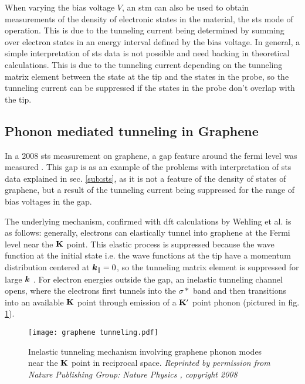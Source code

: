 \documentclass[main.tex]{subfiles}
\begin{document}
When varying the bias voltage \(V\), an \acrshort{stm} can also be used to obtain measurements of the density of electronic states in the material, the \acrshort{sts} mode of operation.
This is due to the tunneling current being determined by summing over electron states in an energy interval defined by the bias voltage.
In general, a simple interpretation of \acrshort{sts} data is not possible and need backing in theoretical calculations.
This is due to the tunneling current depending on the tunneling matrix element between the state at the tip and the states in the probe, so the tunneling current can be suppressed if the states in the probe don't overlap with the tip.


\subsection{Phonon mediated tunneling in Graphene}\label{sub:tunneling_graphene}

In a 2008 \acrshort{sts} measurement on graphene, a gap feature around the fermi level was measured \cite{zhang_giant_2008}.
This gap is as an example of the problems with interpretation of \acrshort{sts} data explained in sec. \ref{sub:sts}, as it is not a feature of the density of states of graphene, but a result of the tunneling current being suppressed for the range of bias voltages in the gap.

The underlying mechanism, confirmed with \acrshort{dft} calculations by Wehling et al. \cite{wehling_phonon-mediated_2008} is as follows:
generally, electrons can elastically tunnel into graphene at the Fermi level near the \(\vb{K}\) point.
This elastic process is suppressed because the wave function at the initial state i.e. the wave functions at the tip have a momentum distribution centered at \(\vb*{k}_{\parallel} = 0\), so the tunneling matrix element is suppressed for large \(\vb*{k}\) \cite{vitali_phonon_2004}.
For electron energies outside the gap, an inelastic tunneling channel opens, where the electrons first tunnels into the \(\sigma*\) band and then transitions into an available \(\vb{K}\) point through emission of a \(\vb{K}^{\prime}\) point phonon (pictured in fig. \ref{fig:graphene_tunneling}).

\begin{figure}[htb!]
    \centering
    \texttt{[image: graphene tunneling.pdf]}
    \label{fig:graphene_tunneling}
    \caption{Inelastic tunneling mechanism involving graphene phonon modes near the \(\vb{K}\) point in reciprocal space. \emph{Reprinted by permission from Nature Publishing Group: Nature Physics \cite{zhang_giant_2008}, copyright 2008}}
\end{figure}
\end{document}
